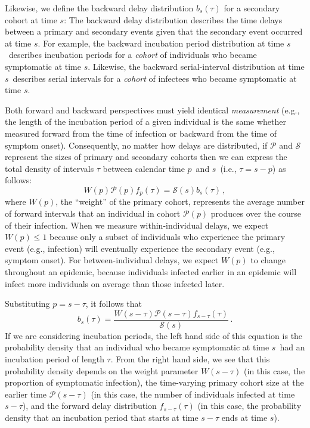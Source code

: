 \documentclass[12pt]{article}
\newcommand{\psymp}{\ensuremath{p}} %
\newcommand{\ssymp}{\ensuremath{s}} %
\newcommand{\psize}{{\mathcal P}} %
\newcommand{\ssize}{{\mathcal S}} %
\begin{document}
Likewise, we define the backward delay distribution $b_\ssymp(\tau)$ for a secondary cohort at time \ssymp:
The backward delay distribution describes the time delays between a primary and secondary events given that the secondary event occurred at time \ssymp.
For example, the backward incubation period distribution at time \ssymp\ describes incubation periods for a \emph{cohort} of individuals who became symptomatic at time \ssymp.
Likewise, the backward serial-interval distribution at time \ssymp\ describes serial intervals for a \emph{cohort} of infectees who became symptomatic at time \ssymp.

Both forward and backward perspectives
must yield identical \emph{measurement} (e.g., the length of the incubation
period of a given individual is the same whether measured forward from
the time of infection or backward from the time of symptom onset).
Consequently, no matter how delays are distributed, if
$\mathcal P$ and $\mathcal S$ represent the sizes of primary and
secondary cohorts then we can express the total density of intervals $\tau$ between calendar time \psymp\ and \ssymp\ (i.e., $\tau=\ssymp-\psymp$) as follows:
\begin{equation}
W(\psymp) \psize(\psymp) f_\psymp(\tau) = \ssize(\ssymp) b_\ssymp(\tau) \,,
\label{eq:match}
\end{equation}
where $W(\psymp)$, the ``weight'' of the primary cohort, represents the average number of forward intervals that an individual in cohort $\psize(\psymp)$ produces over the course of their infection.
When we measure within-individual delays, we expect $W(\psymp) \leq 1$ because only a subset of individuals who experience the primary event (e.g., infection) will eventually experience the secondary event (e.g., symptom onset).
For between-individual delays, we expect $W(\psymp)$ to change throughout an epidemic, because individuals infected earlier in an epidemic will infect more individuals on average than those infected later.

Substituting $\psymp=\ssymp-\tau$, it follows that
\begin{equation}
b_\ssymp(\tau)= \frac{W(\ssymp-\tau) \psize(\ssymp-\tau) f_{\ssymp-\tau} (\tau)}{\ssize(\ssymp)}\,.
\label{eq:backward}
\end{equation}
If we are considering incubation periods, the left hand side of
this equation is the probability density that an individual
who became symptomatic at time \ssymp\ had an incubation period of
length $\tau$.
From the right hand side, we see that this probability density depends on the weight parameter $W(\ssymp-\tau)$ (in this case, the proportion of symptomatic infection),
the time-varying primary cohort size at the earlier time $\psize(\ssymp-\tau)$ (in this case, the number of individuals infected at time $\ssymp-\tau$),
and the forward delay distribution $f_{\ssymp-\tau}(\tau)$ (in this case, the probability density that an incubation period that starts at time $\ssymp-\tau$ ends at time \ssymp).
\end{document}
